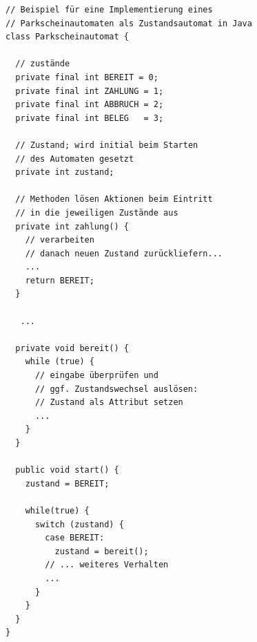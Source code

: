 \begin{verbatim}
// Beispiel für eine Implementierung eines
// Parkscheinautomaten als Zustandsautomat in Java
class Parkscheinautomat {

  // zustände
  private final int BEREIT = 0;
  private final int ZAHLUNG = 1;
  private final int ABBRUCH = 2;
  private final int BELEG   = 3;

  // Zustand; wird initial beim Starten
  // des Automaten gesetzt
  private int zustand;

  // Methoden lösen Aktionen beim Eintritt
  // in die jeweiligen Zustände aus
  private int zahlung() {
    // verarbeiten
    // danach neuen Zustand zurückliefern...
    ...
    return BEREIT;
  }

   ...

  private void bereit() {
    while (true) {
      // eingabe überprüfen und
      // ggf. Zustandswechsel auslösen:
      // Zustand als Attribut setzen
      ...
    }
  }

  public void start() {
    zustand = BEREIT;

    while(true) {
      switch (zustand) {
        case BEREIT:
          zustand = bereit();
        // ... weiteres Verhalten
        ...
      }
    }
  }
}
\end{verbatim}